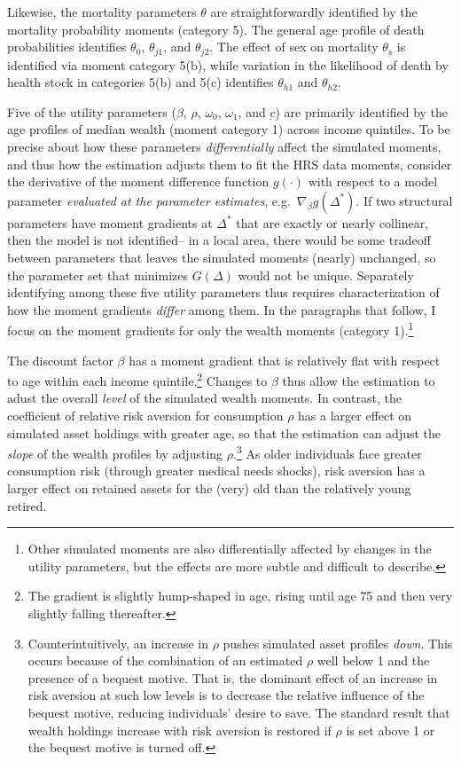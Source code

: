 \documentclass[12pt,pdftex,letterpaper]{article}
\newcommand{\Health}{h}
\newcommand{\Con}{c}
\newcommand{\DiscFac}{\beta}
\newcommand{\ConFloor}{\underbar{\Con}}
\newcommand{\CRRAcon}{\rho}
\newcommand{\Age}{j}
\newcommand{\Sex}{s}
\newcommand{\MortParam}{\theta}
\newcommand{\BequestParam}{\omega}
\begin{document}
Likewise, the mortality parameters $\MortParam$ are straightforwardly identified by the mortality probability moments (category 5).  The general age profile of death probabilities identifies $\MortParam_0$, $\MortParam_{\Age 1}$, and $\MortParam_{\Age 2}$.  The effect of sex on mortality $\MortParam_{\Sex}$ is identified via moment category 5(b), while variation in the likelihood of death by health stock in categories 5(b) and 5(c) identifies $\MortParam_{\Health 1}$ and $\MortParam_{\Health 2}$.

Five of the utility parameters ($\DiscFac$, $\CRRAcon$, $\BequestParam_0$, $\BequestParam_1$, and $\ConFloor$) are primarily identified by the age profiles of median wealth (moment category 1) across income quintiles.  To be precise about how these parameters \textit{differentially} affect the simulated moments, and thus how the estimation adjusts them to fit the HRS data moments, consider the derivative of the moment difference function $g(\cdot)$ with respect to a model parameter \textit{evaluated at the parameter estimates}, e.g.\ $\nabla_{\DiscFac} g(\Delta^*)$.  If two structural parameters have moment gradients at $\Delta^*$ that are exactly or nearly collinear, then the model is not identified-- in a local area, there would be some tradeoff between parameters that leaves the simulated moments (nearly) unchanged, so the parameter set that minimizes $G(\Delta)$ would not be unique.  Separately identifying among these five utility parameters thus requires characterization of how the moment gradients \textit{differ} among them.  In the paragraphs that follow, I focus on the moment gradients for only the wealth moments (category 1).\footnote{Other simulated moments are also differentially affected by changes in the utility parameters, but the effects are more subtle and difficult to describe.}

The discount factor $\DiscFac$ has a moment gradient that is relatively flat with respect to age within each income quintile.\footnote{The gradient is slightly hump-shaped in age, rising until age 75 and then very slightly falling thereafter.}  Changes to $\DiscFac$ thus allow the estimation to adust the overall \textit{level} of the simulated wealth moments.  In contrast, the coefficient of relative risk aversion for consumption $\CRRAcon$ has a larger effect on simulated asset holdings with greater age, so that the estimation can adjust the \textit{slope} of the wealth profiles by adjusting $\CRRAcon$.\footnote{Counterintuitively, an increase in $\CRRAcon$ pushes simulated asset profiles \textit{down}.  This occurs because of the combination of an estimated $\CRRAcon$ well below 1 and the presence of a bequest motive.  That is, the dominant effect of an increase in risk aversion at such low levels is to decrease the relative influence of the bequest motive, reducing individuals' desire to save.  The standard result that wealth holdings increase with risk aversion is restored if $\CRRAcon$ is set above 1 or the bequest motive is turned off.} As older individuals face greater consumption risk (through greater medical needs shocks), risk aversion has a larger effect on retained assets for the (very) old than the relatively young retired.
\end{document}
